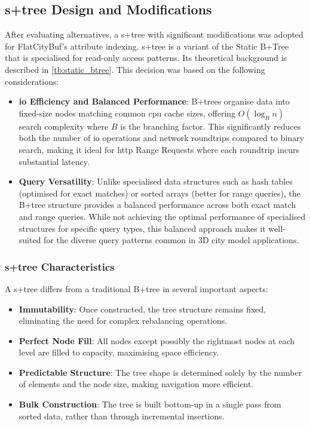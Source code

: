 \subsection{\texorpdfstring{\ac{s+tree}}{S+tree} Design and Modifications}
\label{methodology:attribute_index:static_btree_design}

After evaluating alternatives, a \ac{s+tree} with significant modifications was adopted for FlatCityBuf's attribute indexing. \ac{s+tree} is a variant of the Static B+Tree that is specialised for read-only access patterns. Its theoretical background is described in \autoref{tb:static_btree}. This decision was based on the following considerations:

\begin{itemize}
  \item \textbf{\ac{io} Efficiency and Balanced Performance}: B+trees organise data into fixed-size nodes matching common \ac{cpu} cache sizes, offering $O(\log_B n)$ search complexity where $B$ is the branching factor. This significantly reduces both the number of \ac{io} operations and network roundtrips compared to binary search, making it ideal for \ac{http} Range Requests where each roundtrip incurs substantial latency.

  \item \textbf{Query Versatility}: Unlike specialised data structures such as hash tables (optimised for exact matches) or sorted arrays (better for range queries), the B+tree structure provides a balanced performance across both exact match and range queries. While not achieving the optimal performance of specialised structures for specific query types, this balanced approach makes it well-suited for the diverse query patterns common in 3D city model applications.
\end{itemize}

\subsubsection{\ac{s+tree} Characteristics}
\label{methodology:attribute_index:static_btree_characteristics}

A \ac{s+tree} differs from a traditional B+tree in several important aspects:

\begin{itemize}
  \item \textbf{Immutability}: Once constructed, the tree structure remains fixed, eliminating the need for complex rebalancing operations.

  \item \textbf{Perfect Node Fill}: All nodes except possibly the rightmost nodes at each level are filled to capacity, maximising space efficiency.

  \item \textbf{Predictable Structure}: The tree shape is determined solely by the number of elements and the node size, making navigation more efficient.

  \item \textbf{Bulk Construction}: The tree is built bottom-up in a single pass from sorted data, rather than through incremental insertions.
\end{itemize}

